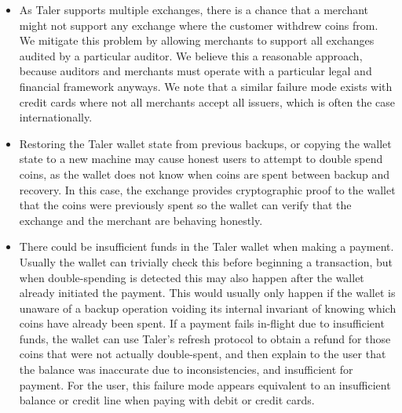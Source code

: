 \documentclass{llncs}
\begin{document}
\begin{itemize}
\item
As Taler supports multiple exchanges, there is a chance that a
merchant might not support any exchange where the customer withdrew
coins from.  We mitigate this problem by allowing merchants to
support all exchanges audited by a particular auditor.  We believe
this a reasonable approach, because auditors and merchants must
operate with a particular legal and financial framework anyways.  We
note that a similar failure mode exists with credit cards where not
all merchants accept all issuers, which is often the case internationally.

\item
Restoring the Taler wallet state from previous backups, or copying the
wallet state to a new machine may cause honest users to attempt to
double spend coins, as the wallet does not know when coins are spent
between backup and recovery.  In this case, the exchange provides
cryptographic proof to the wallet that the coins were previously spent so the
wallet can verify that the exchange and the merchant are behaving honestly.

%
%
%
%
\item
There could be insufficient funds in the Taler wallet when making a
payment.  Usually the wallet can trivially check this before beginning
a transaction, but when double-spending is detected this may also
happen after the wallet already initiated the payment. This would
usually only happen if the wallet is unaware of a backup operation
voiding its internal invariant of knowing which coins have already
been spent.  If a payment fails in-flight due to
insufficient funds, the wallet can use Taler's refresh protocol to
obtain a refund for those coins that were not actually double-spent,
and then explain to the user that the balance was inaccurate due to
inconsistencies, and insufficient for payment.
For the user, this failure mode appears equivalent to an insufficient
balance or credit line when paying with debit or credit cards.
\end{itemize}
\end{document}
